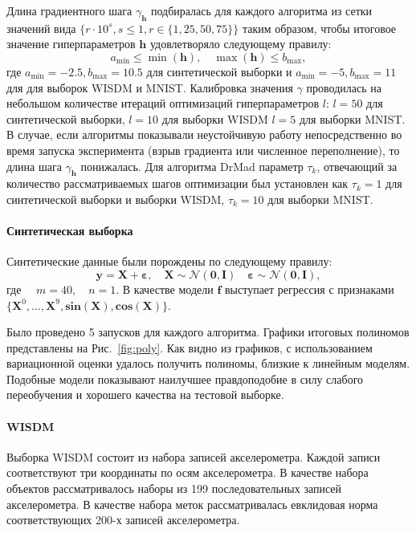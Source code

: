 \documentclass[12pt]{article}
\begin{document}
Длина градиентного шага $\gamma_{\mathbf{h}}$ подбиралась для каждого алгоритма из сетки значений вида $\{r \cdot 10^{s}, s \leq 1, r \in \{1,25,50,75\}\}$  таким образом, чтобы итоговое значение гиперпараметров  $\mathbf{h}$  удовлетворяло следующему правилу:
\[
    a_\text{min} \leq  \min(\mathbf{h}), \quad \max(\mathbf{h}) \leq b_\text{max},
\] 
где  $a_\text{min} = -2.5, b_\text{max}=10.5$ для синтетической выборки и $a_\text{min} = -5, b_\text{max}=11$ для для выборок WISDM и MNIST.
Калибровка значения $\gamma$ проводилась на небольшом количестве итераций оптимизаций гиперпараметров $l$:
$l = 50$ для синтетической выборки,  $l=10$ для выборки WISDM $l=5$ для выборки MNIST. В случае, если алгоритмы показывали неустойчивую работу непосредственно во время запуска эксперимента (взрыв градиента или численное переполнение), то длина шага $\gamma_\mathbf{h}$ понижалась. Для алгоритма DrMad параметр $\tau_k$, отвечающий за количество рассматриваемых шагов оптимизации был установлен как $\tau_k=1$ для синтетической выборки и выборки WISDM, $\tau_k=10$ для выборки MNIST.



\paragraph{Синтетическая выборка}
Синтетические данные были порождены по следующему правилу:
\[
	\mathbf{y} = \mathbf{X} + \boldsymbol{\varepsilon},\quad \mathbf{X}  \sim \mathcal{N}(\mathbf{0}, \mathbf{I}) \quad \boldsymbol{\varepsilon} \sim \mathcal{N}(\mathbf{0}, \mathbf{I}),
\]
где $\quad m = 40, \quad n = 1.$
В качестве модели $\mathbf{f}$ выступает регрессия с признаками $\{\mathbf{X}^0, \dots, \mathbf{X}^9, \textbf{sin}(\mathbf{X}), \textbf{cos}(\mathbf{X})\}$.

Было проведено 5 запусков для каждого алгоритма.
Графики итоговых полиномов представлены на Рис.~\ref{fig:poly}. Как видно из графиков, с использованием вариационной оценки удалось получить полиномы, близкие к линейным моделям. Подобные модели показывают наилучшее правдоподобие в силу слабого переобучения и хорошего качества на тестовой выборке. 


\paragraph{WISDM}
Выборка WISDM состоит из набора записей акселерометра. Каждой записи соответствуют три координаты по осям акселерометра. В качестве набора объектов рассматривалось наборы из 199 последовательных записей акселерометра. В качестве набора меток рассматривалась евклидовая норма соответствующих 200-х записей акселерометра.
\end{document}
